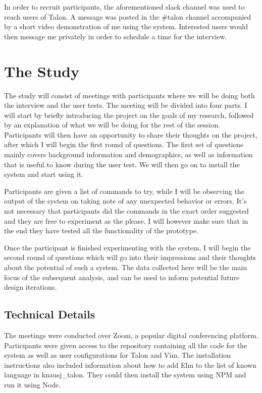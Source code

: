 \documentclass[../thesis.tex]{subfiles}
\begin{document}
In order to recruit participants, the aforementioned slack channel was used to reach users of Talon.
A message was posted in the \#talon channel accompanied by a short video demonstration of me using the system.
Interested users would then message me privately in order to schedule a time for the interview.

\section{The Study}
The study will consist of meetings with participants where we will be doing both the interview and the user tests.
The meeting will be divided into four parts.
I will start by briefly introducing the project on the goals of my research, followed by an explanation of what we will be doing for
the rest of the session.
Participants will then have an opportunity to share their thoughts on the project, after which I will begin the first round of questions.
The first set of questions mainly covers background information and demographics, as well as information that is useful to know
during the user test.
We will then go on to install the system and start using it.

Participants are given a list of commands to try, while I will be observing
the output of the system on taking note of any unexpected behavior or errors.
It's not necessary that participants did the commands in the exact order suggested and they are free to experiment as the please.
I will however make sure that in the end they have tested all the functionality of the prototype.

Once the participant is finished experimenting with the system, I will begin the second round of questions
which will go into their impressions and their thoughts about the potential of such a system.
The data collected here will be the main focus of the subsequent analysis, and can be used to
inform potential future design iterations.

\subsection{Technical Details}
The meetings were conducted over Zoom, a popular digital conferencing platform.
Participants were given access to the repository containing all the code for the system
as well as user configurations for Talon and Vim.
The installation instructions also included information about how to add Elm to the list of known language in knausj\_talon.
They could then install the system using NPM and run it using Node.
\end{document}
